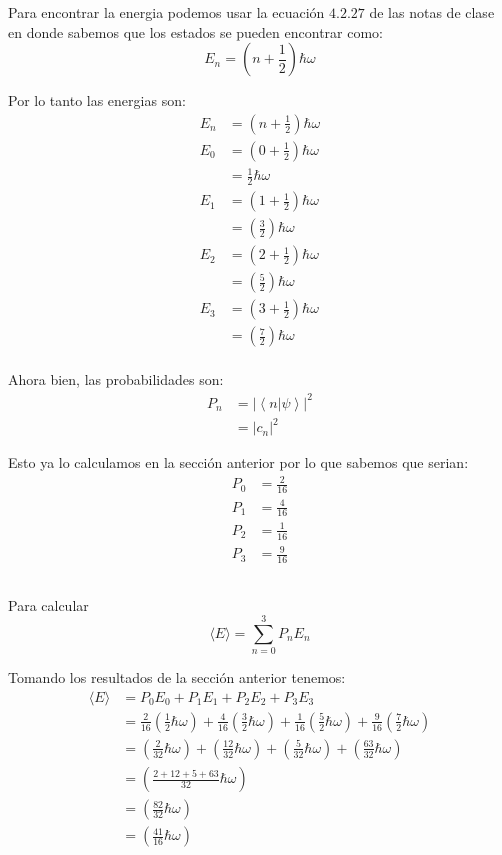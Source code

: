 \documentclass{report}
\begin{document}
Para encontrar la energia podemos usar la ecuación $4.2.27$ de las notas de clase en donde sabemos que los estados se pueden encontrar como:
$$
  E_{n} = \left(n + \frac{1}{2}\right)\hbar \omega
$$

Por lo tanto las energias son:
\begin{align*}
  E_{n} &= \left(n + \frac{1}{2}\right)\hbar \omega\\
  E_{0} &= \left(0 + \frac{1}{2}\right)\hbar \omega\\
  &= \frac{1}{2}\hbar\omega\\
  E_{1} &= \left(1 + \frac{1}{2}\right)\hbar \omega\\
  &= \left(\frac{3}{2}\right)\hbar \omega\\
  E_{2} &= \left(2 + \frac{1}{2}\right)\hbar \omega\\
  &= \left(\frac{5}{2}\right)\hbar \omega\\
  E_{3} &= \left(3 + \frac{1}{2}\right)\hbar \omega\\
  &= \left(\frac{7}{2}\right)\hbar \omega\\
\end{align*}

Ahora bien, las probabilidades son:
\begin{align*}
  P_n &= \left|\left<n | \psi\right>\right|^2\\
  &= \left|c_n\right|^2
\end{align*}

Esto ya lo calculamos en la sección anterior por lo que sabemos que serian:
\begin{align*}
  P_0 &= \frac{2}{16}\\
  P_1 &= \frac{4}{16}\\
  P_2 &= \frac{1}{16}\\
  P_3 &= \frac{9}{16}
\end{align*}

\section{}

Para calcular
\[
  \langle E \rangle = \sum_{n = 0}^{3} P_n E_n
\]

Tomando los resultados de la sección anterior tenemos:
\begin{align*}
  \langle E \rangle &= P_0E_0 + P_1E_1 + P_2E_2 + P_3E_3\\
  &= \frac{2}{16}\left(\frac{1}{2}\hbar\omega\right) +
\frac{4}{16}\left(\frac{3}{2}\hbar\omega\right) +
\frac{1}{16}\left(\frac{5}{2}\hbar\omega\right) +
\frac{9}{16}\left(\frac{7}{2}\hbar\omega\right)\\
  &= \left(\frac{2}{32}\hbar\omega\right) +
\left(\frac{12}{32}\hbar\omega\right) +
\left(\frac{5}{32}\hbar\omega\right) +
\left(\frac{63}{32}\hbar\omega\right)\\
  &= \left(\frac{2 + 12 + 5 + 63}{32}\hbar\omega\right)\\
  &= \left(\frac{82}{32}\hbar\omega\right)\\
  &= \left(\frac{41}{16}\hbar\omega\right)
\end{align*}

\chapter{}

\chapter{}
\end{document}
